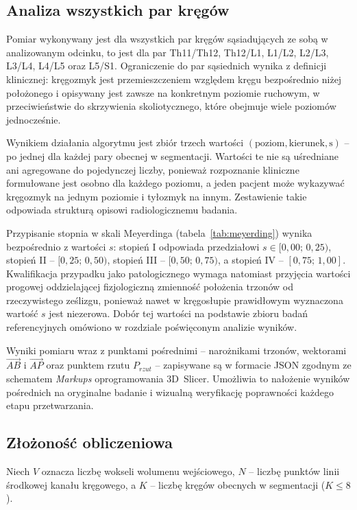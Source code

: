 \subsection{Analiza wszystkich par kręgów}
\label{subsec:pary-kregow}

Pomiar wykonywany jest dla wszystkich par kręgów sąsiadujących ze sobą w analizowanym odcinku, to jest dla par Th11/Th12, Th12/L1, L1/L2, L2/L3, L3/L4, L4/L5 oraz L5/S1.
Ograniczenie do par sąsiednich wynika z definicji klinicznej: kręgozmyk jest przemieszczeniem względem kręgu bezpośrednio niżej położonego i opisywany jest zawsze na konkretnym poziomie ruchowym, w przeciwieństwie do skrzywienia skoliotycznego, które obejmuje wiele poziomów jednocześnie.

Wynikiem działania algorytmu jest zbiór trzech wartości $(\text{poziom}, \text{kierunek}, \text{s})$ -- po jednej dla każdej pary obecnej w segmentacji.
Wartości te nie są uśredniane ani agregowane do pojedynczej liczby, ponieważ rozpoznanie kliniczne formułowane jest osobno dla każdego poziomu, a jeden pacjent może wykazywać kręgozmyk na jednym poziomie i tyłozmyk na innym.
Zestawienie takie odpowiada strukturą opisowi radiologicznemu badania.

Przypisanie stopnia w skali Meyerdinga (tabela~\ref{tab:meyerding}) wynika bezpośrednio z wartości $s$: stopień I odpowiada przedziałowi $s \in [0{,}00;\, 0{,}25)$, stopień II -- $[0{,}25;\, 0{,}50)$, stopień III -- $[0{,}50;\, 0{,}75)$, a stopień IV -- $[0{,}75;\, 1{,}00]$.
Kwalifikacja przypadku jako patologicznego wymaga natomiast przyjęcia wartości progowej oddzielającej fizjologiczną zmienność położenia trzonów od rzeczywistego ześlizgu, ponieważ nawet w kręgosłupie prawidłowym wyznaczona wartość $s$ jest niezerowa.
Dobór tej wartości na podstawie zbioru badań referencyjnych omówiono w rozdziale poświęconym analizie wyników.

Wyniki pomiaru wraz z punktami pośrednimi -- narożnikami trzonów, wektorami $\vec{AB}$ i $\vec{AP}$ oraz punktem rzutu $P_{rzut}$ -- zapisywane są w formacie JSON zgodnym ze schematem \textit{Markups} oprogramowania 3D~Slicer.
Umożliwia to nałożenie wyników pośrednich na oryginalne badanie i wizualną weryfikację poprawności każdego etapu przetwarzania.

\subsection{Złożoność obliczeniowa}
\label{subsec:zlozonosc}

Niech $V$ oznacza liczbę wokseli wolumenu wejściowego, $N$ -- liczbę punktów linii środkowej kanału kręgowego, a $K$ -- liczbę kręgów obecnych w segmentacji ($K \leq 8$).


